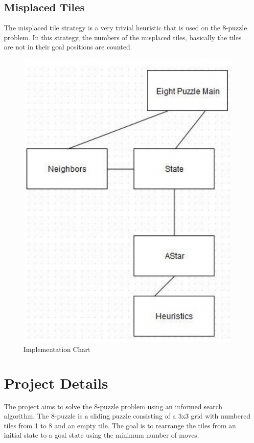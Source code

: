 \documentclass[12pt]{report}
\begin{document}
\subsection{Misplaced Tiles}
The misplaced tile strategy is a very trivial heuristic that is
used on the 8-puzzle problem. In this strategy, the numbers
of the misplaced tiles, basically the tiles are not in their goal
positions are counted.
\begin{figure}[h]
    \begin{center}
     \includegraphics[scale=0.4]{figures/implementation-chart.png}
    \end{center}
    \caption{Implementation Chart}
\end{figure}


\section{Project Details}
The project aims to solve the 8-puzzle problem using an informed search algorithm. The 8-puzzle is a sliding puzzle consisting of a 3x3 grid with numbered tiles from 1 to 8 and an empty tile. The goal is to rearrange the tiles from an initial state to a goal state using the minimum number of moves.
\end{document}
